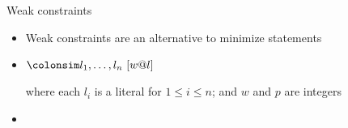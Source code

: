 \begin{frame}[fragile]{Weak constraints}
  \medskip
  \begin{itemize}
  \item<1-> Weak constraints are an alternative to minimize statements
    \smallskip
  \item<2->  \quad $\colonsim  l_1,\dots, l_n\ [w@l]$

    \smallskip
    where each $l_i$ is a literal for $1\leq i\leq n$;
    and $w$ and $p$ are integers
    \medskip
  \item<3-> 
\begin{semiverbatim}
\end{semiverbatim}
  \end{itemize}
\end{frame}
%
%
